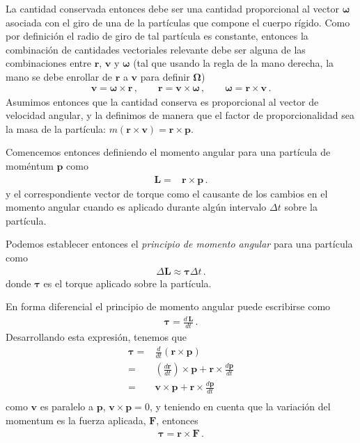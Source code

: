 La cantidad conservada entonces debe ser una cantidad proporcional al
vector $\boldsymbol{\omega}$ asociada con el giro de una de la
partículas que compone el cuerpo rígido. 
Como por definición el radio de giro de tal partícula es constante,
entonces la combinación de cantidades vectoriales relevante debe ser
alguna de las combinaciones entre $\mathbf{r}$, $\mathbf{v}$ y
$\boldsymbol{\mathbf{\omega}}$ (tal que usando la regla de la mano
derecha, la mano se debe enrollar de $\mathbf{r}$ a $\mathbf{v}$ para
definir $\boldsymbol{\Omega}$)
\begin{align*}
  \mathbf{v}=\boldsymbol{\omega}\times\mathbf{r}\,,\qquad
  \mathbf{r}=\mathbf{v}\times\boldsymbol{\omega}\,,\qquad
  \boldsymbol{\omega}=\mathbf{r}\times\mathbf{v}\,.
\end{align*}
Asumimos entonces que la cantidad conserva es proporcional al vector
de velocidad angular, y la definimos de manera que el factor de
proporcionalidad sea la masa de la partícula:
$m(\mathbf{r}\times\mathbf{v})=\mathbf{r}\times\mathbf{p}$. 

Comencemos entonces definiendo el momento angular para una partícula de moméntum $\mathbf{p}$ como
\begin{align}
  \label{eq:L}
  \mathbf{L}=&\mathbf{r}\times\mathbf{p}\,.
\end{align}
y el correspondiente vector de torque como el causante de los cambios
en el momento angular cuando es aplicado durante algún intervalo
$\Delta t$ sobre la partícula. 

Podemos establecer entonces el \emph{principio de momento angular}
para una partícula como
\begin{align}
  \Delta \mathbf{L}\approx \boldsymbol{\tau}\Delta t\,.
\end{align}
donde $\boldsymbol{\tau}$ es el torque aplicado sobre la partícula. 

En forma diferencial el principio de momento angular puede escribirse como
\begin{align}
\label{eq:tautor}
  \boldsymbol{\tau}=\frac{d\,\mathbf{L}}{dt}\,.
\end{align}
Desarrollando esta expresión, tenemos que
\begin{align}
  \boldsymbol{\tau}=&\frac{d}{dt}\left(\mathbf{r}\times\mathbf{p}\right)\nonumber\\
=&\left(\frac{d\mathbf{r}}{dt}\right)\times\mathbf{p}+
\mathbf{r}\times\frac{d\mathbf{p}}{dt}\nonumber\\
=&\mathbf{v}\times\mathbf{p}+
\mathbf{r}\times\frac{d\mathbf{p}}{dt}\nonumber\\
\end{align}
como $\mathbf{v}$ es paralelo a $\mathbf{p}$,
$\mathbf{v}\times\mathbf{p}=0$, y teniendo en cuenta que la variación
del momentum es la fuerza aplicada, $\mathbf{F}$, entonces
\begin{align}
  \label{eq:torqueini}
  \boldsymbol{\tau}=\mathbf{r}\times\mathbf{F}\,.
\end{align}

